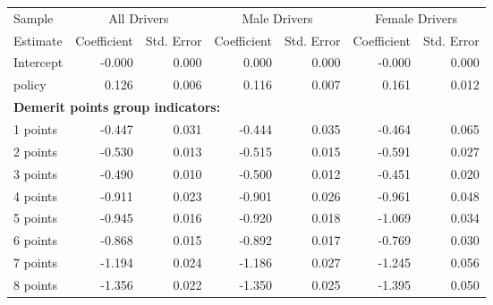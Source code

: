 
\begin{table}%
\centering 
\begin{tabular}{l r r r r r r} 

\hline 
 

Sample 
 & \multicolumn{2}{c}{All  Drivers}  & \multicolumn{2}{c}{Male  Drivers}  & \multicolumn{2}{c}{Female  Drivers}   \\ 
 

 \cmidrule(lr){1-1}\cmidrule(lr){2-3}\cmidrule(lr){4-5}\cmidrule(lr){6-7} 

Estimate  & Coefficient & Std. Error  & Coefficient & Std. Error  & Coefficient & Std. Error   \\ 
 

\hline 
 
Intercept  & -0.000  &  0.000  &  0.000  &  0.000  & -0.000  &  0.000   \\ 
 
policy  &  0.126  &  0.006  &  0.116  &  0.007  &  0.161  &  0.012   \\ 
 

\hline 
 
\multicolumn{4}{l}{\textbf{Demerit points group indicators:}}  \\ 
 
1 points  & -0.447  &  0.031  & -0.444  &  0.035  & -0.464  &  0.065   \\ 
 
2 points  & -0.530  &  0.013  & -0.515  &  0.015  & -0.591  &  0.027   \\ 
 
3 points  & -0.490  &  0.010  & -0.500  &  0.012  & -0.451  &  0.020   \\ 
 
4 points  & -0.911  &  0.023  & -0.901  &  0.026  & -0.961  &  0.048   \\ 
 
5 points  & -0.945  &  0.016  & -0.920  &  0.018  & -1.069  &  0.034   \\ 
 
6 points  & -0.868  &  0.015  & -0.892  &  0.017  & -0.769  &  0.030   \\ 
 
7 points  & -1.194  &  0.024  & -1.186  &  0.027  & -1.245  &  0.056   \\ 
 
8 points  & -1.356  &  0.022  & -1.350  &  0.025  & -1.395  &  0.050   \\ 
 

\end{tabular}
\end{table}
